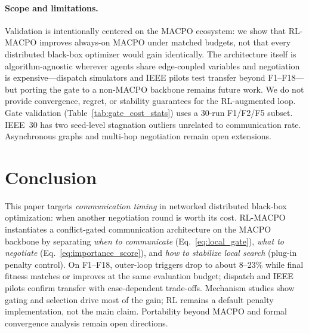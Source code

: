 \documentclass[conference]{IEEEtran}
\begin{document}
\paragraph{Scope and limitations.}
Validation is intentionally centered on the MACPO ecosystem: we show that RL-MACPO improves always-on MACPO under matched budgets, not that every distributed black-box optimizer would gain identically. The architecture itself is algorithm-agnostic wherever agents share edge-coupled variables and negotiation is expensive---dispatch simulators and IEEE pilots test transfer beyond F1--F18---but porting the gate to a non-MACPO backbone remains future work. We do not provide convergence, regret, or stability guarantees for the RL-augmented loop. Gate validation (Table~\ref{tab:gate_cost_stats}) uses a 30-run F1/F2/F5 subset. IEEE~30 has two seed-level stagnation outliers unrelated to communication rate. Asynchronous graphs and multi-hop negotiation remain open extensions.

\section{Conclusion}\label{sec:conclusion}
This paper targets \emph{communication timing} in networked distributed black-box optimization: when another negotiation round is worth its cost. RL-MACPO instantiates a conflict-gated communication architecture on the MACPO backbone by separating \emph{when to communicate} (Eq.~\eqref{eq:local_gate}), \emph{what to negotiate} (Eq.~\eqref{eq:importance_score}), and \emph{how to stabilize local search} (plug-in penalty control). On F1--F18, outer-loop triggers drop to about 8--23\% while final fitness matches or improves at the same evaluation budget; dispatch and IEEE pilots confirm transfer with case-dependent trade-offs. Mechanism studies show gating and selection drive most of the gain; RL remains a default penalty implementation, not the main claim. Portability beyond MACPO and formal convergence analysis remain open directions.
\end{document}
